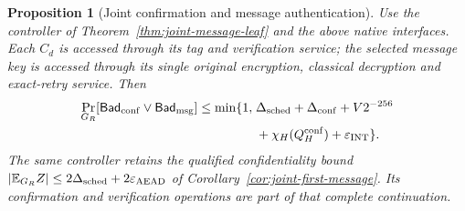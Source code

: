 \documentclass[pdflatex]{sn-jnl}
\theoremstyle{thmstyleone}
\newtheorem{proposition}[theorem]{Proposition}
\theoremstyle{thmstylethree}
\theoremstyle{thmstyletwo}
\begin{document}
\begin{proposition}[Joint confirmation and message authentication]
\label{prop:confirmation-message-auth}
Use the controller of Theorem~\ref{thm:joint-message-leaf} and the above
native interfaces. Each $C_d$ is accessed through its tag and verification
service; the selected message key is accessed through its single original
encryption, classical decryption and exact-retry service. Then
\begin{equation}
\begin{split}
 \Pr_{G_R}[\mathsf{Bad}_{\rm conf}\lor\mathsf{Bad}_{\rm msg}]
 \le\min\{1,\;&\Delta_{\rm sched}+\Delta_{\rm conf}
       +V2^{-256}\\
       &+\chi_H(Q_H^{\rm conf})+\varepsilon_{\rm INT}\}.
\end{split}
\label{eq:confirmation-message-auth}
\end{equation}
The same controller retains the qualified confidentiality bound
$|\mathbb E_{G_R}Z|\le2\Delta_{\rm sched}
 +2\varepsilon_{\rm AEAD}$ of
Corollary~\ref{cor:joint-first-message}. Its confirmation and verification
operations are part of that complete continuation.
\end{proposition}
\end{document}

